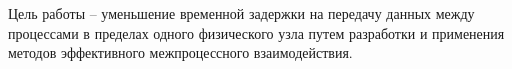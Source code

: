 Цель работы -- уменьшение временной задержки на передачу данных между процессами в пределах одного физического узла путем разработки и применения методов эффективного межпроцессного взаимодействия.
%
%
%
%
%



